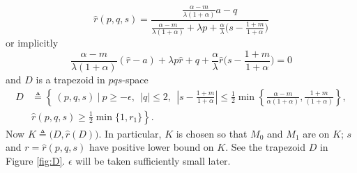 \documentclass[a4paper,11pt]{article}
\theoremstyle{remark}
\begin{document}
\begin{equation*}
\hat{r}(p,q,s) = \frac{ \frac{\alpha-m}{\lambda(1+\alpha)}a - q }{  \frac{\alpha-m}{\lambda(1+\alpha)} + \lambda p + \frac{\alpha}{\lambda}\big(s- \frac{1+m}{1+\alpha}\big)}
\end{equation*}
or implicitly
\begin{equation}
\frac{\alpha-m}{\lambda(1+\alpha)}(\hat{r}-a) + \lambda p\hat{r} + q +\frac{\alpha}{\lambda}\hat{r}\big(s- \frac{1+m}{1+\alpha}\big)=0 \label{eq:implicit}
\end{equation}
and $D$ is a trapezoid in $pqs$-space
\begin{align*}
 D &\triangleq \left\{ \: (p,q,s) \: \Big| \:  p\ge-\epsilon, ~~ |q|\le2, ~~ \left|s-\frac{1+m}{1+\alpha}\right| \le \frac{1}{2}\min\left\{\frac{\alpha-m}{\alpha(1+\alpha)},\frac{1+m}{(1+\alpha)}\right\},\right.  \\
 &\left. \hat{r}(p,q,s)\ge \frac{1}{2}\min\{1,r_1\}\right\}.
\end{align*}
Now $K\triangleq\big(D,\hat{r}(D)\big)$. In particular, $K$ is chosen so that $M_0$ and $M_1$ are on $K$; $s$ and $r=\hat{r}(p,q,s)$ have positive lower bound on $K$. See the trapezoid $D$ in Figure \ref{fig:D}. $\epsilon$ will be taken sufficiently small later.
\end{document}
